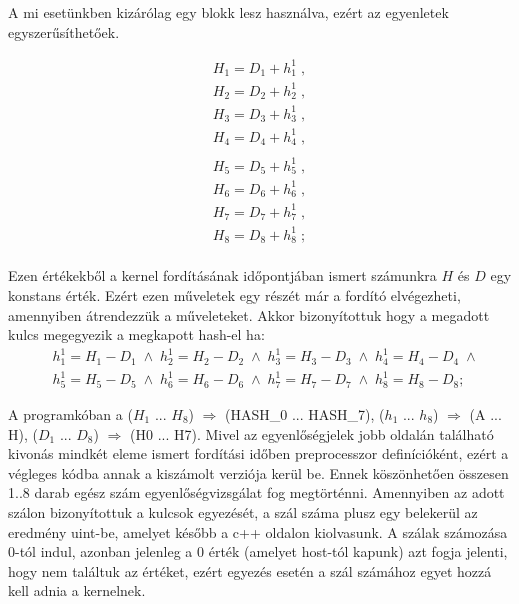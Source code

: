 A mi esetünkben kizárólag egy blokk lesz használva, ezért az egyenletek egyszerűsíthetőek.

\begin{multicols}{2}

    \begin{equation*}
        \begin{split}
            H_1 = D_1 + h_1^1 \; , \\
            H_2 = D_2 + h_2^1 \; , \\
            H_3 = D_3 + h_3^1 \; , \\
            H_4 = D_4 + h_4^1 \; , \\
        \end{split}
    \end{equation*}
    \break
    \begin{equation*}
        \begin{split}
            H_5 = D_5 + h_5^1 \; , \\
            H_6 = D_6 + h_6^1 \; , \\
            H_7 = D_7 + h_7^1 \; , \\
            H_8 = D_8 + h_8^1 \; ; \\
        \end{split}
    \end{equation*}
    
\end{multicols}

Ezen értékekből a kernel fordításának időpontjában ismert számunkra $H$ és $D$ egy konstans érték. Ezért ezen műveletek egy részét már a fordító elvégezheti, amennyiben átrendezzük a műveleteket. Akkor bizonyítottuk hogy a megadott kulcs megegyezik a megkapott hash-el ha:
%
\begin{equation*}
    \begin{aligned}
    &h_1^1 = H_1 - D_1 \;\land\; h_2^1 = H_2 - D_2 \;\land\; h_3^1 = H_3 - D_3 \;\land\; h_4^1 = H_4 - D_4 \;\land \\
    &h_5^1 = H_5 - D_5 \;\land\; h_6^1 = H_6 - D_6 \;\land\; h_7^1 = H_7 - D_7 \;\land\; h_8^1 = H_8 - D_8;
    \end{aligned}
\end{equation*}

A programkóban a ($H_1$ ... $H_8$) $\Rightarrow$ (HASH\_0 ... HASH\_7), ($h_1$ ... $h_8$) $\Rightarrow$ (A ... H), ($D_1$ ... $D_8$) $\Rightarrow$ (H0 ... H7). Mivel az egyenlőségjelek jobb oldalán található kivonás mindkét eleme ismert fordítási időben preprocesszor definícióként, ezért a végleges kódba annak a kiszámolt verziója kerül be. Ennek köszönhetően összesen 1..8 darab egész szám egyenlőségvizsgálat fog megtörténni. Amennyiben az adott szálon bizonyítottuk a kulcsok egyezését, a szál száma plusz egy belekerül az eredmény uint-be, amelyet később a c++ oldalon kiolvasunk. A szálak számozása 0-tól indul, azonban jelenleg a 0 érték (amelyet host-tól kapunk) azt fogja jelenti, hogy nem találtuk az értéket, ezért egyezés esetén a szál számához egyet hozzá kell adnia a kernelnek.

